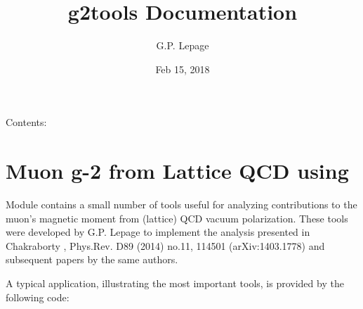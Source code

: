 \documentclass[letterpaper,10pt,english]{sphinxmanual}
\title{g2tools Documentation}
\date{Feb 15, 2018}
\author{G.P. Lepage}
\begin{document}
\maketitle
\sphinxtableofcontents
{}\label{\detokenize{index::doc}}


Contents:


\chapter{Muon g-2 from Lattice QCD using }
\label{\detokenize{overview:g2tools-documentation}}\label{\detokenize{overview:muon-g-2-from-lattice-qcd-using-g2tools}}\label{\detokenize{overview::doc}}
Module {\hyperref[\detokenize{g2tools:module-g2tools}]{}} contains a small number of tools useful for analyzing
contributions to the muon’s magnetic moment from (lattice) QCD vacuum
polarization. These tools were developed by G.P. Lepage to implement the
analysis presented in Chakraborty , Phys.Rev. D89 (2014) no.11, 114501
(arXiv:1403.1778) and subsequent papers by the same authors.

A typical application, illustrating the most important tools, is
provided by the following code:
\end{document}
